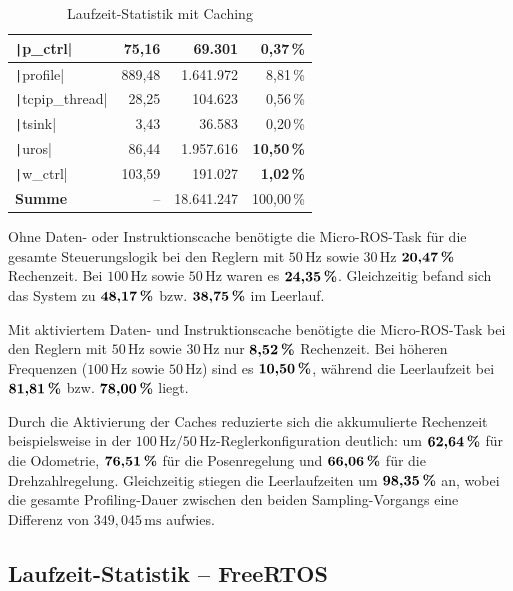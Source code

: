 \begin{table}[H]
{{\begin{minipage}[b]{0.50\hsize}
\begin{tabular}{|l|r|r|r|}
        \texttt|p_ctrl| & 75,16 & 69.301 & \textbf{0,37\,\%} \\ \hline
        \texttt|profile| & 889,48 & 1.641.972 & 8,81\,\% \\ \hline
        \texttt|tcpip_thread| & 28,25 & 104.623 & 0,56\,\% \\ \hline
        \texttt|tsink| & 3,43 & 36.583 & 0,20\,\% \\ \hline
        \texttt|uros| & 86,44 & 1.957.616 & \textbf{10,50\,\%} \\ \hline
        \texttt|w_ctrl| & 103,59 & 191.027 & \textbf{1,02\,\%} \\ \hline
        \hline
        \textbf{Summe} & -- & 18.641.247 & 100,00\,\% \\ \hline
        \end{tabular}
        \caption{Laufzeit-Statistik mit Caching}
    \end{minipage}
}}
\end{table}

Ohne Daten- oder Instruktionscache benötigte die Micro-ROS-Task für die gesamte
Steuerungslogik bei den Reglern mit $50\,\text{Hz}$ sowie $30\,\text{Hz}$
$\textbf{20,47\,\%}$ Rechenzeit. Bei $100\,\text{Hz}$ sowie $50\,\text{Hz}$
waren es $\textbf{24,35\,\%}$. Gleichzeitig befand sich das System zu
$\textbf{48,17\,\%}$ bzw. $\textbf{38,75\,\%}$ im Leerlauf.

Mit aktiviertem Daten- und Instruktionscache benötigte die Micro-ROS-Task bei
den Reglern mit $50\,\text{Hz}$ sowie $30\,\text{Hz}$ nur $\textbf{8,52\,\%}$
Rechenzeit. Bei höheren Frequenzen ($100\,\text{Hz}$ sowie $50\,\text{Hz}$) sind
es $\textbf{10,50\,\%}$, während die Leerlaufzeit bei $\textbf{81,81\,\%}$ bzw.
$\textbf{78,00\,\%}$ liegt.

Durch die Aktivierung der Caches reduzierte sich die akkumulierte Rechenzeit
beispielsweise in der $100\,\text{Hz}/50\,\text{Hz}$-Reglerkonfiguration
deutlich: um $\textbf{62,64\,\%}$ für die Odometrie, $\textbf{76,51\,\%}$ für
die Posenregelung und $\textbf{66,06\,\%}$ für die Drehzahlregelung.
Gleichzeitig stiegen die Leerlaufzeiten um $\textbf{98,35\,\%}$ an, wobei die
gesamte Profiling-Dauer zwischen den beiden Sampling-Vorgangs eine Differenz von
$349,\!045\,\text{ms}$ aufwies.

\subsection{Laufzeit-Statistik -- FreeRTOS}

